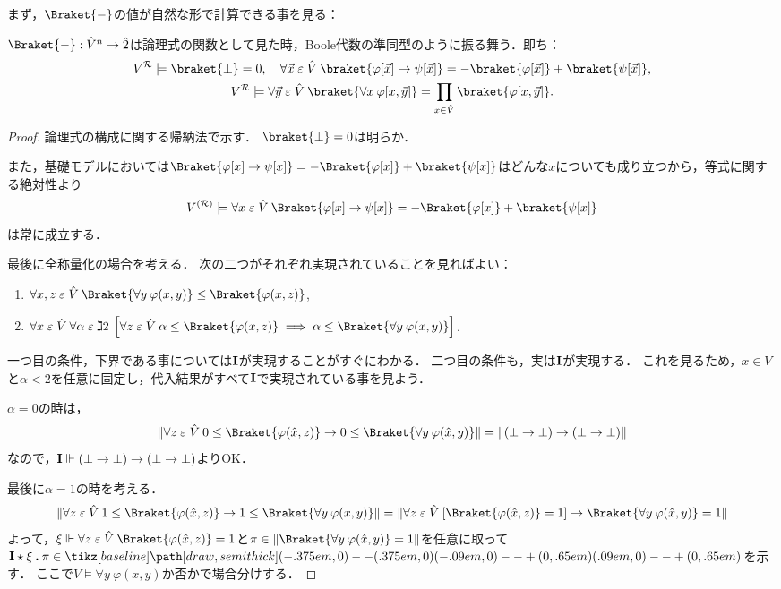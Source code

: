 \documentclass[realisability.tex]{subfiles}
\begin{document}
まず，$\Braket{ - }$の値が自然な形で計算できる事を見る：
\begin{lemma}\label{lem:char-homo}
 $\Braket{ - }: \hat{V}^n \to \hat{2}$は論理式の関数として見た時，Boole代数の準同型のように振る舞う．即ち：
 \begin{gather*}
  V^{\mathcal{R}} \models \braket{\bot} = 0, \quad \forall \vec{x} \strin \hat{V}\: \braket{\varphi[\vec{x}] \to \psi[\vec{x}]} = - \braket{\varphi[\vec{x}]} + \braket{\psi[\vec{x}]},\\
  V^{\mathcal{R}} \models \forall \vec{y} \strin \hat{V} \: \braket{\forall x \: \varphi[x, \vec{y}]} = \prod_{x \in \hat{V}} \braket{\varphi[x, \vec{y}]}.
 \end{gather*}
\end{lemma}
\begin{proof}
 論理式の構成に関する帰納法で示す．
 $\braket{\bot} = 0$は明らか．

 また，基礎モデルにおいては$\Braket{ \varphi[x] \to \psi[x] } = -\Braket{\varphi[x]} + \braket{\psi[x]}$はどんな$x$についても成り立つから，等式に関する絶対性より
 \[
  V^{(\mathcal{R})} \models \forall x \strin \hat{V} \: \Braket{ \varphi[x] \to \psi[x] } = -\Braket{\varphi[x]} + \braket{\psi[x]}
 \]
 は常に成立する．

 最後に全称量化の場合を考える．
 次の二つがそれぞれ実現されていることを見ればよい：
 \begin{enumerate}
  \item $\forall x, z \strin \hat{V} \: \Braket{\forall y \: \varphi(x, y) } \leq \Braket{\varphi(x, z)}$,
  \item $\forall x \strin \hat{V} \: \forall \alpha \strin \gimel 2\:
          \left[\forall z \strin \hat{V} \: \alpha \leq \Braket{\varphi(x, z)}
            \implies \alpha \leq \Braket{\forall y \: \varphi(x,y)}
          \right]$.
 \end{enumerate}
 一つ目の条件，下界である事については$\mathsf{\mathbf{I}}$が実現することがすぐにわかる．
 二つ目の条件も，実は$\mathsf{\mathbf{I}}$が実現する．
 これを見るため，$x \in V$と$\alpha < 2$を任意に固定し，代入結果がすべて$\mathsf{\mathbf{I}}$で実現されている事を見よう．

 $\alpha = 0$の時は，
 \[
  \|\forall z \strin \hat{V} \: 0 \leq \Braket{\varphi(\hat{x}, z)}
 \to 0 \leq \Braket{\forall y \: \varphi(\hat{x},y)}\| = \|(\bot \to \bot) \to (\bot \to \bot)\|
 \]
 なので，$\mathsf{\mathbf{I}} \Vdash (\bot \to \bot) \to (\bot \to \bot)$よりOK．

 最後に$\alpha = 1$の時を考える．
 \[
  \|\forall z \strin \hat{V} \: 1 \leq \Braket{\varphi(\hat{x}, z)}
 \to 1 \leq \Braket{\forall y \: \varphi(x,y)}\| =
 \|\forall z \strin \hat{V} \:[\Braket{\varphi(\hat{x}, z)} = 1]
 \to \Braket{\forall y \: \varphi(\hat{x},y)} = 1\|
 \]
 よって，$\xi \Vdash \forall z \strin \hat{V} \: \Braket{\varphi(\hat{x},z)} = 1$と$\pi \in \|\Braket{\forall y \: \varphi(\hat{x},y)} = 1\|$を任意に取って$\comb{I} \cons \xi \push \pi \in \pole$を示す．
 ここで$V \models \forall y \: \varphi(x,y)$か否かで場合分けする．


\end{proof}
\end{document}
